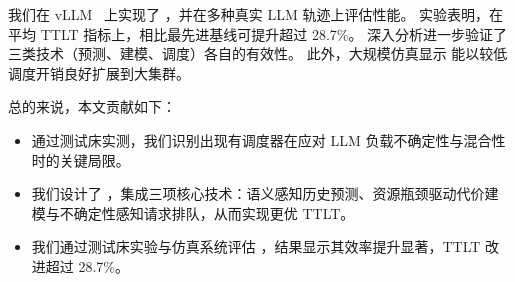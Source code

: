 我们在 vLLM~\cite{vllm_v0_8_2} 上实现了 \oursched，并在多种真实 LLM 轨迹上评估性能。
实验表明，在平均 TTLT 指标上，\oursched 相比最先进基线可提升超过 28.7\%。
深入分析进一步验证了 \oursched 三类技术（预测、建模、调度）各自的有效性。
此外，大规模仿真显示 \oursched 能以较低调度开销良好扩展到大集群。

总的来说，本文贡献如下：
\begin{itemize}
    \item 通过测试床实测，我们识别出现有调度器在应对 LLM 负载不确定性与混合性时的关键局限。
    \item 我们设计了 \oursched，集成三项核心技术：语义感知历史预测、资源瓶颈驱动代价建模与不确定性感知请求排队，从而实现更优 TTLT。
    \item 我们通过测试床实验与仿真系统评估 \oursched，结果显示其效率提升显著，TTLT 改进超过 28.7\%。
\end{itemize}
